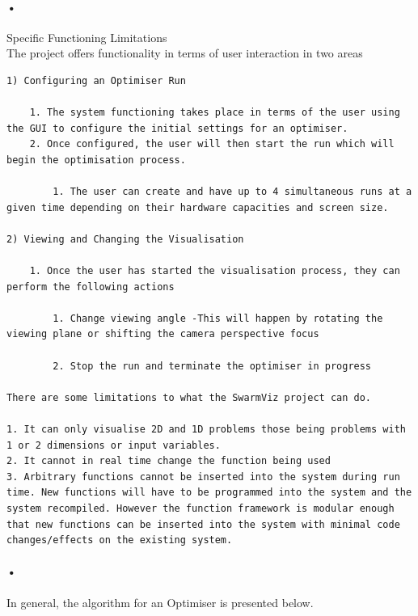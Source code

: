 \documentclass[11pt]{article}
\begin{document}
\paragraph{•}
Specific Functioning Limitations 
\\
The project offers functionality in terms of user interaction in two areas
\begin{verbatim}
1) Configuring an Optimiser Run

	1. The system functioning takes place in terms of the user using the GUI to configure the initial settings for an optimiser.
	2. Once configured, the user will then start the run which will begin the optimisation process.

		1. The user can create and have up to 4 simultaneous runs at a given time depending on their hardware capacities and screen size.

2) Viewing and Changing the Visualisation

	1. Once the user has started the visualisation process, they can perform the following actions

		1. Change viewing angle -This will happen by rotating the viewing plane or shifting the camera perspective focus

		2. Stop the run and terminate the optimiser in progress

There are some limitations to what the SwarmViz project can do.

1. It can only visualise 2D and 1D problems those being problems with 1 or 2 dimensions or input variables. 
2. It cannot in real time change the function being used
3. Arbitrary functions cannot be inserted into the system during run time. New functions will have to be programmed into the system and the system recompiled. However the function framework is modular enough that new functions can be inserted into the system with minimal code changes/effects on the existing system.

\end{verbatim}

\paragraph{•}
In general, the algorithm for an Optimiser is presented below.
\end{document}
